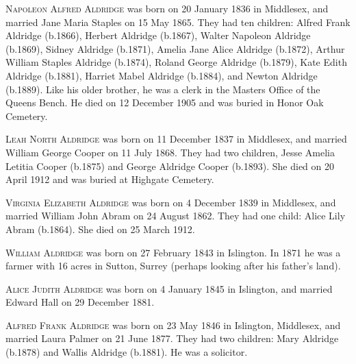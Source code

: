 \textsc{Napoleon Alfred Aldridge} was born on 20 January 1836 in Middlesex, and married Jane Maria Staples on 15 May 1865. They had ten children: Alfred Frank Aldridge (b.1866), Herbert Aldridge (b.1867), Walter Napoleon Aldridge (b.1869), Sidney Aldridge (b.1871), Amelia Jane Alice Aldridge (b.1872), Arthur William Staples Aldridge (b.1874), Roland George Aldridge (b.1879), Kate Edith Aldridge (b.1881), Harriet Mabel Aldridge (b.1884), and Newton Aldridge (b.1889).  Like his older brother, he was a clerk in the Masters Office of the Queens Bench. He died on 12 December 1905 and was buried in Honor Oak Cemetery.

\textsc{Leah North Aldridge} was born on 11 December 1837 in Middlesex, and married William George Cooper on 11 July 1868. They had two children, Jesse Amelia Letitia Cooper (b.1875) and George Aldridge Cooper (b.1893). She died on	20 April 1912 and was buried at Highgate Cemetery.

\textsc{Virginia Elizabeth Aldridge} was born on 4 December 1839 in	Middlesex, and married William John Abram on 24 August 1862. They had one child: Alice Lily Abram (b.1864). She died on 25 March 1912.

\textsc{William Aldridge} was born on 27 February 1843 in	Islington. In 1871 he was a farmer with 16 acres in	Sutton, Surrey (perhaps looking after his father's land).

\textsc{Alice Judith Aldridge} was born on 4 January 1845 in	Islington, and married Edward Hall on 29 December 1881.  

\textsc{Alfred Frank Aldridge} was born on 23 May 1846 in Islington, Middlesex, and married Laura Palmer on 21 June 1877. They had two children:  Mary Aldridge (b.1878) and Wallis Aldridge (b.1881). He was a solicitor.




